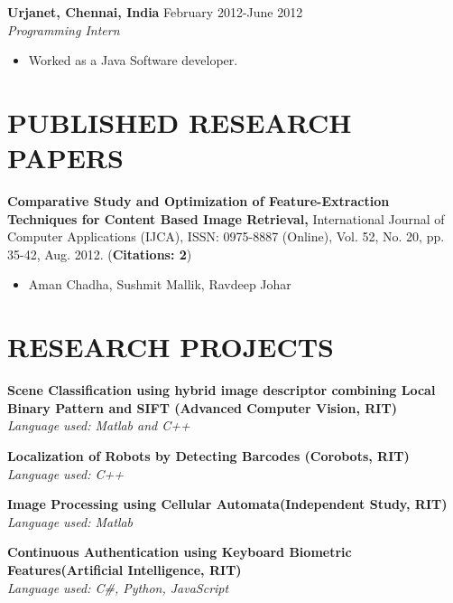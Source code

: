 \documentclass{res}
\begin{document}
\begin{resume}
 {\bf  Urjanet, Chennai, India    \hfill }February 2012-June 2012 
\\\emph{ Programming Intern} \\
\begin{itemize}
\vspace{-0.15in} 
\item[] Worked as a Java Software developer.
 \end {itemize}

\section{PUBLISHED RESEARCH PAPERS}
\vspace{0.1in} 

 {\bf Comparative Study and Optimization of Feature-Extraction Techniques for Content Based Image Retrieval,}
 International Journal of Computer Applications (IJCA), ISSN: 0975-8887 (Online), Vol. 52, No. 20, pp. 35-42, Aug. 2012.  ({\bf Citations: 2})

\begin{itemize}
\setlength{\itemsep}{0pt}
\item Aman Chadha, Sushmit Mallik, Ravdeep Johar
 \end {itemize}
\vspace{-0.1in} 
 

\section{RESEARCH PROJECTS}
\vspace{0.1in} 
{\bf Scene Classification using hybrid image descriptor combining Local Binary Pattern and SIFT (Advanced Computer Vision, RIT)}
\\ \emph{ Language used: Matlab and C++ }


\pagebreak
\vspace{-0.1in}
{\bf Localization of Robots by Detecting Barcodes (Corobots, RIT)}
\\ \emph{ Language used: C++ }


\vspace{-0.1in}
{\bf Image Processing using Cellular Automata(Independent Study, RIT)}
\\ \emph{ Language used: Matlab }


\vspace{-0.1in} 
{\bf Continuous Authentication using Keyboard Biometric Features(Artificial Intelligence, RIT)}
\\ \emph{ Language used: C\#, Python, JavaScript}


\end{resume}
\end{document}
